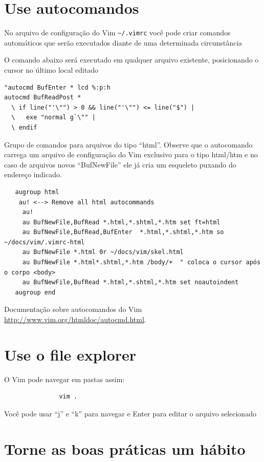 \documentclass[10pt,a4paper,openany]{book}
\begin{document}
\section{Use autocomandos }
\label{Use autocomandos }

No arquivo de configuração do Vim \verb|~/.vimrc| você pode criar comandos
automáticos que serão executados diante de uma determinada
circunstância

O comando abaixo será executado em qualquer arquivo existente, posicionando o cursor no último local editado

\begin{verbatim}
"autocmd BufEnter * lcd %:p:h
autocmd BufReadPost *
  \ if line("'\"") > 0 && line("'\"") <= line("$") |
  \   exe "normal g`\"" |
  \ endif
\end{verbatim}


Grupo de comandos para arquivos do tipo ``html''. Observe que o
autocomando carrega um arquivo de configuração do Vim exclusivo para o
tipo html/htm e no caso de arquivos novos ``BufNewFile'' ele já cria um
esqueleto puxando do endereço indicado.

\begin{verbatim}
   augroup html
    au! <--> Remove all html autocommands
     au!
     au BufNewFile,BufRead *.html,*.shtml,*.htm set ft=html
     au BufNewFile,BufRead,BufEnter  *.html,*.shtml,*.htm so ~/docs/vim/.vimrc-html
     au BufNewFile *.html 0r ~/docs/vim/skel.html
     au BufNewFile *.html*.shtml,*.htm /body/+  " coloca o cursor após o corpo <body>
     au BufNewFile,BufRead *.html,*.shtml,*.htm set noautoindent
   augroup end
\end{verbatim}

Documentação sobre autocomandos do Vim \url{http://www.vim.org/htmldoc/autocmd.html}.

\section{Use o file explorer}\label{Use o file explorer}

O Vim pode navegar em pastas assim:

\begin{verbatim}
			   vim .
\end{verbatim}

Você pode usar ``j'' e ``k'' para navegar e Enter para editar o arquivo selecionado

\section{Torne as boas práticas um hábito }\label{Torne as boas práticas um hábito }
\end{document}
